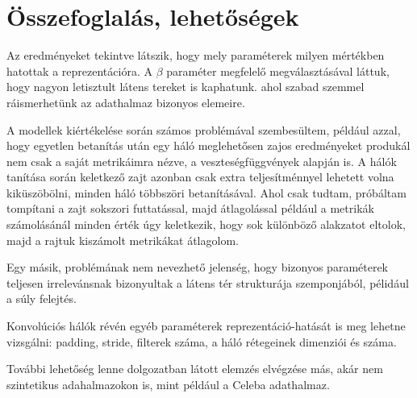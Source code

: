 \chapter{Összefoglalás, lehetőségek}

Az eredményeket tekintve látszik, hogy mely paraméterek milyen mértékben hatottak a reprezentációra. A $\beta$ paraméter megfelelő megválasztásával láttuk, hogy nagyon letisztult látens tereket is kaphatunk. ahol szabad szemmel ráismerhetünk az adathalmaz bizonyos elemeire.

A modellek kiértékelése során számos problémával szembesültem, például azzal, hogy egyetlen betanítás után egy háló meglehetősen zajos eredményeket produkál nem csak a saját metrikáimra nézve, a veszteségfüggvények alapján is. A hálók tanítása során keletkező zajt azonban csak extra teljesítménnyel lehetett volna kiküszöbölni, minden háló többszöri betanításával. Ahol csak tudtam, próbáltam tompítani a zajt sokszori futtatással, majd átlagolással például a metrikák számolásánál minden érték úgy keletkezik, hogy sok különböző alakzatot eltolok, majd a rajtuk kiszámolt metrikákat átlagolom. 

Egy másik, problémának nem nevezhető jelenség, hogy bizonyos paraméterek teljesen irrelevánsnak bizonyultak a látens tér strukturája szemponjából, pélidául a súly felejtés.

Konvolúciós hálók révén egyéb paraméterek reprezentáció-hatását is meg lehetne vizsgálni: padding, stride, filterek száma, a háló rétegeinek dimenziói és száma.

További lehetőség lenne dolgozatban látott elemzés elvégzése más, akár nem szintetikus adahalmazokon is, mint például a Celeba adathalmaz.

